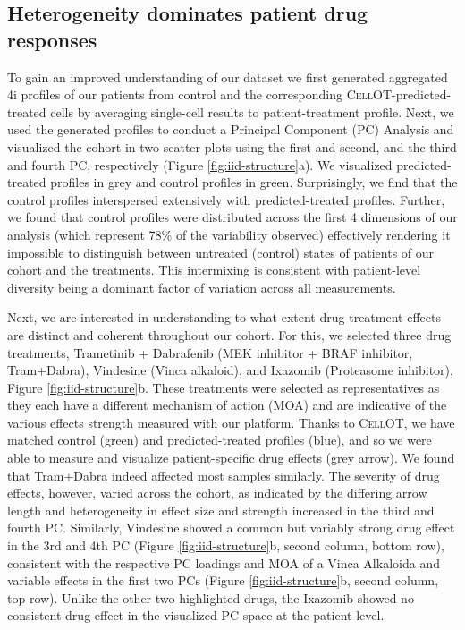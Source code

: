 \subsection{Heterogeneity dominates patient drug responses}
To gain an improved understanding of our dataset we first generated aggregated 4i profiles of our patients from control and the corresponding \textsc{CellOT}-predicted-treated cells by averaging single-cell results to patient-treatment profile.
Next, we used the generated profiles to conduct a Principal Component (PC) Analysis and visualized the cohort in two scatter plots using the first and second, and the third and fourth PC, respectively (Figure \ref{fig:iid-structure}a).
We visualized predicted-treated profiles in grey and control profiles in green.
Surprisingly, we find that the control profiles interspersed extensively with predicted-treated profiles.
Further, we found that control profiles were distributed across the first 4 dimensions of our analysis (which represent 78\% of the variability observed) effectively rendering it impossible to distinguish between untreated (control) states of patients of our cohort and the treatments.
This intermixing is consistent with patient-level diversity being a dominant factor of variation across all measurements.

Next, we are interested in understanding to what extent drug treatment effects are distinct and coherent throughout our cohort.
For this, we selected three drug treatments, Trametinib + Dabrafenib (MEK inhibitor + BRAF inhibitor, Tram+Dabra), Vindesine (Vinca alkaloid), and Ixazomib (Proteasome inhibitor), Figure \ref{fig:iid-structure}b.
These treatments were selected as representatives as they each have a different mechanism of action (MOA) and are indicative of the various effects strength measured with our platform.
Thanks to \textsc{CellOT}, we have matched control (green) and predicted-treated profiles (blue), and so we were able to measure and visualize patient-specific drug effects (grey arrow).
 We found that Tram+Dabra indeed affected most samples similarly.
The severity of drug effects, however, varied across the cohort, as indicated by the differing arrow length and heterogeneity in effect size and strength increased in the third and fourth PC.
 Similarly, Vindesine showed a common but variably strong drug effect in the 3rd and 4th PC (Figure \ref{fig:iid-structure}b, second column, bottom row), consistent with the respective PC loadings and MOA of a Vinca Alkaloida \cite{dhyani2022} and variable effects in the first two PCs (Figure \ref{fig:iid-structure}b, second column, top row).
 Unlike the other two highlighted drugs, the Ixazomib showed no consistent drug effect in the visualized PC space at the patient level.  

